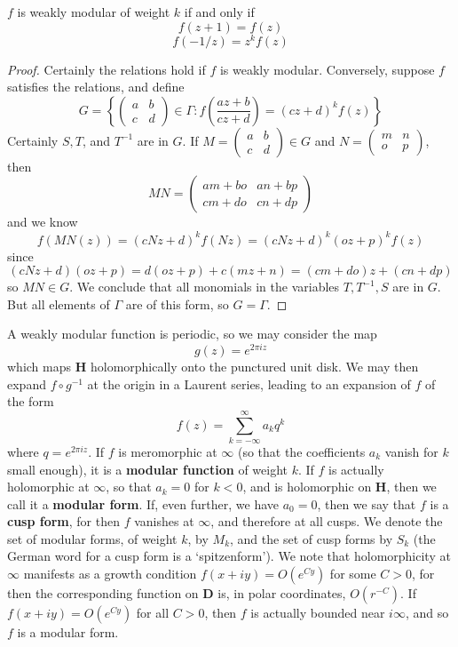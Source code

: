 \begin{theorem}
    $f$ is weakly modular of weight $k$ if and only if
    \[ f(z + 1) = f(z) \]
    \[ f(-1/z) = z^k f(z) \]
\end{theorem}
\begin{proof}
    Certainly the relations hold if $f$ is weakly modular. Conversely, suppose $f$ satisfies the relations, and define
    \[ G = \left\{ \begin{pmatrix} a & b \\ c & d \end{pmatrix} \in \Gamma : f\left(\frac{az + b}{cz + d}\right) = (cz + d)^k f(z) \right\} \]
    Certainly $S, T$, and $T^{-1}$ are in $G$. If $M = \begin{pmatrix} a & b \\ c & d \end{pmatrix} \in G$ and $N = \begin{pmatrix} m & n \\ o & p \end{pmatrix}$, then
    \[ MN = \begin{pmatrix} am + bo & an + bp \\ cm + do & cn + dp \end{pmatrix} \]
    and we know
    \[ f\left( MN(z) \right) = (cNz + d)^k f(Nz) = (cNz + d)^k (oz + p)^k f(z) \]
    since
    \[ (cNz + d)(oz + p) = d(oz + p) + c(mz + n) = (cm + do)z + (cn + dp) \]
    so $MN \in G$. We conclude that all monomials in the variables $T, T^{-1}, S$ are in $G$. But all elements of $\Gamma$ are of this form, so $G = \Gamma$.
\end{proof}

A weakly modular function is periodic, so we may consider the map
%
\[ g(z) = e^{2 \pi i z} \]
%
which maps $\mathbf{H}$ holomorphically onto the punctured unit disk. We may then expand $f \circ g^{-1}$ at the origin in a Laurent series, leading to an expansion of $f$ of the form
%
\[ f(z) = \sum_{k = -\infty}^\infty a_kq^k \]
%
where $q = e^{2 \pi i z}$. If $f$ is meromorphic at $\infty$ (so that the coefficients $a_k$ vanish for $k$ small enough), it is a {\bf modular function} of weight $k$. If $f$ is actually holomorphic at $\infty$, so that $a_k = 0$ for $k < 0$, and is holomorphic on $\mathbf{H}$, then we call it a {\bf modular form}. If, even further, we have $a_0 = 0$, then we say that $f$ is a {\bf cusp form}, for then $f$ vanishes at $\infty$, and therefore at all cusps. We denote the set of modular forms, of weight $k$, by $M_k$, and the set of cusp forms by $S_k$ (the German word for a cusp form is a `spitzenform'). We note that holomorphicity at $\infty$ manifests as a growth condition $f(x + iy) = O(e^{Cy})$ for some $C > 0$, for then the corresponding function on $\mathbf{D}$ is, in polar coordinates, $O(r^{-C})$. If $f(x + iy) = O(e^{Cy})$ for all $C > 0$, then $f$ is actually bounded near $i \infty$, and so $f$ is a modular form.

